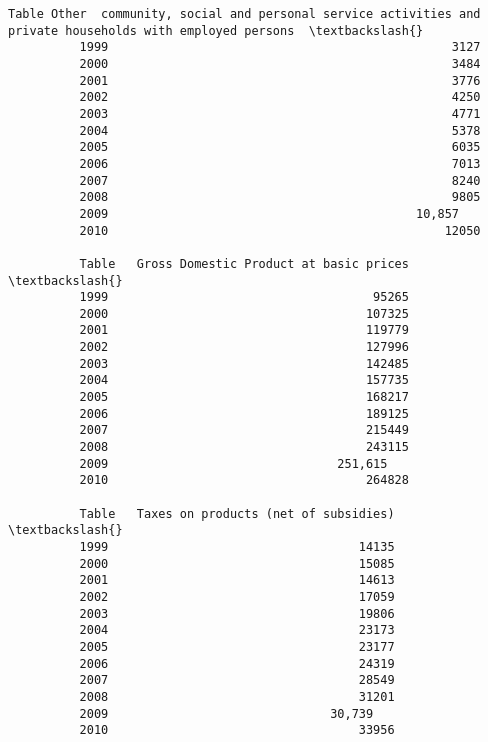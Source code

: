 \documentclass[11pt]{article}
\begin{document}
\begin{Verbatim}[commandchars=\\\{\}]
          Table Other  community, social and personal service activities and private households with employed persons  \textbackslash{}
          1999                                                3127                                                      
          2000                                                3484                                                      
          2001                                                3776                                                      
          2002                                                4250                                                      
          2003                                                4771                                                      
          2004                                                5378                                                      
          2005                                                6035                                                      
          2006                                                7013                                                      
          2007                                                8240                                                      
          2008                                                9805                                                      
          2009                                           10,857                                                         
          2010                                               12050                                                      
          
          Table   Gross Domestic Product at basic prices  \textbackslash{}
          1999                                     95265   
          2000                                    107325   
          2001                                    119779   
          2002                                    127996   
          2003                                    142485   
          2004                                    157735   
          2005                                    168217   
          2006                                    189125   
          2007                                    215449   
          2008                                    243115   
          2009                                251,615      
          2010                                    264828   
          
          Table   Taxes on products (net of subsidies)  \textbackslash{}
          1999                                   14135   
          2000                                   15085   
          2001                                   14613   
          2002                                   17059   
          2003                                   19806   
          2004                                   23173   
          2005                                   23177   
          2006                                   24319   
          2007                                   28549   
          2008                                   31201   
          2009                               30,739      
          2010                                   33956   
          

\end{Verbatim}
\end{document}
